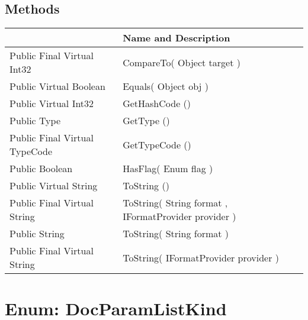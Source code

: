 \documentclass[11pt, oneside, a4paper]{book}
\begin{document}
\subsection{Methods}
\begin{center}
\begin{tabular}{| p{3cm} | p{12cm} | }
\hline
\textbf{ } & \textbf{ Name and Description}\\
\hline
 Public  Final  Virtual  Int32 &  CompareTo(\hypertarget{SoftwareEngineeringTools.{}Documentation.{}DocParamDir.{}CompareTo\_Object}{} Object  target  )\\
\hline
 Public  Virtual  Boolean &  Equals(\hypertarget{SoftwareEngineeringTools.{}Documentation.{}DocParamDir.{}Equals\_Object}{} Object  obj  )\\
\hline
 Public  Virtual  Int32 &  GetHashCode ()\hypertarget{SoftwareEngineeringTools.{}Documentation.{}DocParamDir.{}GetHashCode}{}\\
\hline
 Public  Type &  GetType ()\hypertarget{SoftwareEngineeringTools.{}Documentation.{}DocParamDir.{}GetType}{}\\
\hline
 Public  Final  Virtual  TypeCode &  GetTypeCode ()\hypertarget{SoftwareEngineeringTools.{}Documentation.{}DocParamDir.{}GetTypeCode}{}\\
\hline
 Public  Boolean &  HasFlag(\hypertarget{SoftwareEngineeringTools.{}Documentation.{}DocParamDir.{}HasFlag\_Enum}{} Enum  flag  )\\
\hline
 Public  Virtual  String &  ToString ()\hypertarget{SoftwareEngineeringTools.{}Documentation.{}DocParamDir.{}ToString}{}\\
\hline
 Public  Final  Virtual  String &  ToString(\hypertarget{SoftwareEngineeringTools.{}Documentation.{}DocParamDir.{}ToString\_String\_IFormatProvider}{} String  format  ,  IFormatProvider  provider  )\\
\hline
 Public  String &  ToString(\hypertarget{SoftwareEngineeringTools.{}Documentation.{}DocParamDir.{}ToString\_String}{} String  format  )\\
\hline
 Public  Final  Virtual  String &  ToString(\hypertarget{SoftwareEngineeringTools.{}Documentation.{}DocParamDir.{}ToString\_IFormatProvider}{} IFormatProvider  provider  )\\
\hline
\end{tabular}
\end{center}
 


\hypertarget{SoftwareEngineeringTools.{}Documentation.{}DocParamListKind}{}
\section{Enum: DocParamListKind}
\end{document}
